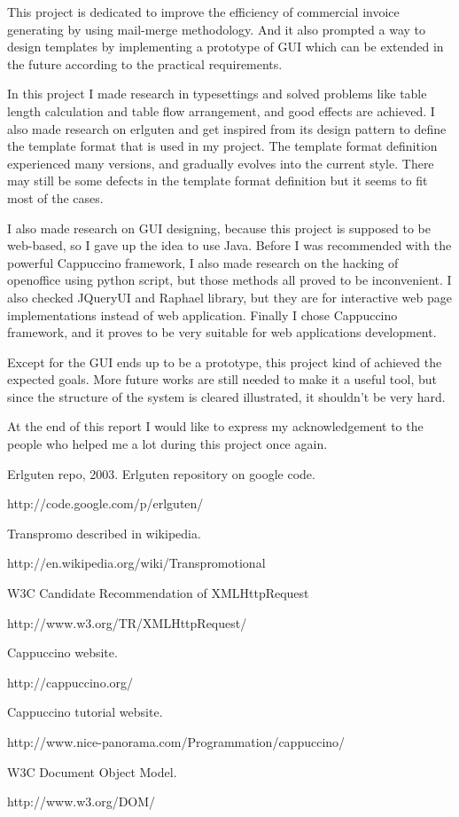 \documentclass[12pt,twoside,a4paper]{report}
\begin{document}
  This project is dedicated to improve the efficiency of commercial invoice generating by using mail-merge methodology. And it also prompted a way to design templates by implementing a prototype of GUI which can be extended in the future according to the practical requirements. 

  In this project I made research in typesettings and solved problems like table length calculation and table flow arrangement, and good effects are achieved. I also made research on erlguten and get inspired from its design pattern to define the template format that is used in my project. The template format definition experienced many versions, and gradually evolves into the current style. There may still be some defects in the template format definition but it seems to fit most of the cases. 

  I also made research on GUI designing, because this project is supposed to be web-based, so I gave up the idea to use Java. Before I was recommended with the powerful Cappuccino framework, I also made research on the hacking of openoffice using python script, but those methods all proved to be inconvenient. I also checked JQueryUI and Raphael library, but they are for interactive web page implementations instead of web application. Finally I chose Cappuccino framework, and it proves to be very suitable for web applications development.

  Except for the GUI ends up to be a prototype, this project kind of achieved the expected goals. More future works are still needed to make it a useful tool, but since the structure of the system is cleared illustrated, it shouldn't be very hard.

  At the end of this report I would like to express my acknowledgement to the people who helped me a lot during this project once again. 

\begin{thebibliography}{9}
Erlguten repo, 2003. Erlguten repository on google code. 

http://code.google.com/p/erlguten/

 Transpromo described in wikipedia.

http://en.wikipedia.org/wiki/Transpromotional

 W3C Candidate Recommendation of XMLHttpRequest

http://www.w3.org/TR/XMLHttpRequest/

 Cappuccino website. 

http://cappuccino.org/

 Cappuccino tutorial website. 

http://www.nice-panorama.com/Programmation/cappuccino/

 W3C Document Object Model.

http://www.w3.org/DOM/

\end{thebibliography}
\end{document}
